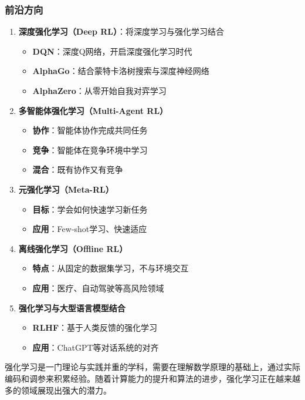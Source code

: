 \subsubsection{前沿方向}
\begin{enumerate}
    \item \textbf{深度强化学习（Deep RL）}：将深度学习与强化学习结合
    \begin{itemize}
        \item \textbf{DQN}：深度Q网络，开启深度强化学习时代
        \item \textbf{AlphaGo}：结合蒙特卡洛树搜索与深度神经网络
        \item \textbf{AlphaZero}：从零开始自我对弈学习
    \end{itemize}
    
    \item \textbf{多智能体强化学习（Multi-Agent RL）}
    \begin{itemize}
        \item \textbf{协作}：智能体协作完成共同任务
        \item \textbf{竞争}：智能体在竞争环境中学习
        \item \textbf{混合}：既有协作又有竞争
    \end{itemize}
    
    \item \textbf{元强化学习（Meta-RL）}
    \begin{itemize}
        \item \textbf{目标}：学会如何快速学习新任务
        \item \textbf{应用}：Few-shot学习、快速适应
    \end{itemize}
    
    \item \textbf{离线强化学习（Offline RL）}
    \begin{itemize}
        \item \textbf{特点}：从固定的数据集学习，不与环境交互
        \item \textbf{应用}：医疗、自动驾驶等高风险领域
    \end{itemize}
    
    \item \textbf{强化学习与大型语言模型结合}
    \begin{itemize}
        \item \textbf{RLHF}：基于人类反馈的强化学习
        \item \textbf{应用}：ChatGPT等对话系统的对齐
    \end{itemize}
\end{enumerate}

强化学习是一门理论与实践并重的学科，需要在理解数学原理的基础上，通过实际编码和调参来积累经验。随着计算能力的提升和算法的进步，强化学习正在越来越多的领域展现出强大的潜力。